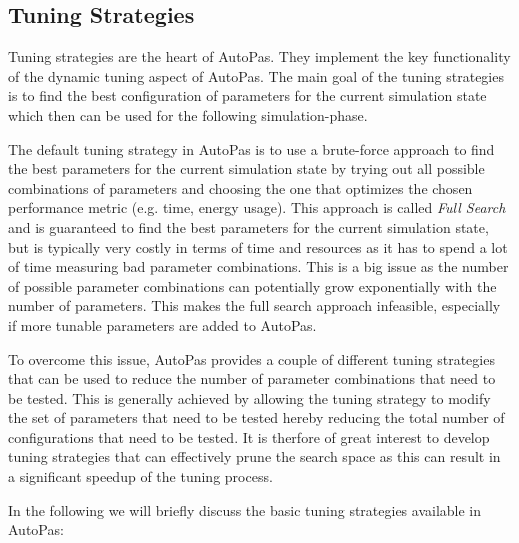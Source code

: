 \subsection*{Tuning Strategies}

Tuning strategies are the heart of AutoPas. They implement the key functionality of the dynamic tuning aspect of AutoPas. The main goal of the tuning strategies is to find the best configuration of parameters for the current simulation state which then can be used for the following simulation-phase.

The default tuning strategy in AutoPas is to use a brute-force approach to find the best parameters for the current simulation state by trying out all possible combinations of parameters and choosing the one that optimizes the chosen performance metric (e.g. time, energy usage). This approach is called \emph{Full Search} and is guaranteed to find the best parameters for the current simulation state, but is typically very costly in terms of time and resources as it has to spend a lot of time measuring bad parameter combinations.  This is a big issue as the number of possible parameter combinations can potentially grow exponentially with the number of parameters. This makes the full search approach infeasible, especially if more tunable parameters are added to AutoPas.

To overcome this issue, AutoPas provides a couple of different tuning strategies that can be used to reduce the number of parameter combinations that need to be tested. This is generally achieved by allowing the tuning strategy to modify the set of parameters that need to be tested hereby reducing the total number of configurations that need to be tested. It is therfore of great interest to develop tuning strategies that can effectively prune the search space as this can result in a significant speedup of the tuning process. 

In the following we will briefly discuss the basic tuning strategies available in AutoPas:

